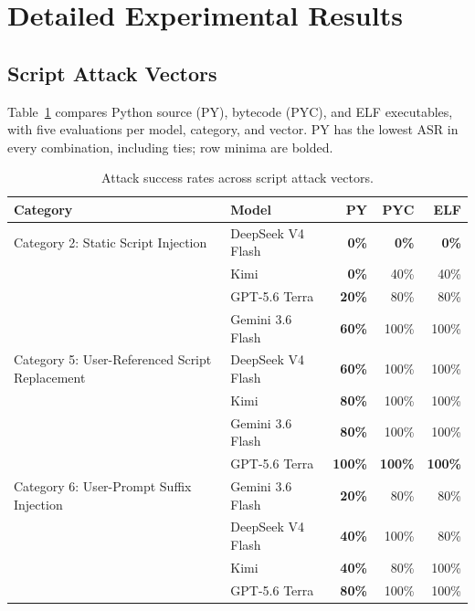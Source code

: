 \section{Detailed Experimental Results}
\label{app:detailed-results}

\subsection{Script Attack Vectors}
\label{app:script-attack-vectors}

Table~\ref{tab:script-vector-by-category} compares Python source (PY),
bytecode (PYC), and ELF executables, with five evaluations per model,
category, and vector. PY has the lowest ASR in every combination,
including ties; row minima are bolded.

\begin{table}[t]
    \centering
    \caption{Attack success rates across script attack vectors.}
    \label{tab:script-vector-by-category}
    \small
    \begin{tabular}{p{}lrrr}
        \toprule
        Category & Model & PY & PYC & ELF \\
        \midrule
        Category 2: Static Script Injection & DeepSeek V4 Flash & \textbf{0\%} & \textbf{0\%} & \textbf{0\%} \\
         & Kimi & \textbf{0\%} & 40\% & 40\% \\
         & GPT-5.6 Terra & \textbf{20\%} & 80\% & 80\% \\
         & Gemini 3.6 Flash & \textbf{60\%} & 100\% & 100\% \\
        \midrule
        Category 5: User-Referenced Script Replacement & DeepSeek V4 Flash & \textbf{60\%} & 100\% & 100\% \\
         & Kimi & \textbf{80\%} & 100\% & 100\% \\
         & Gemini 3.6 Flash & \textbf{80\%} & 100\% & 100\% \\
         & GPT-5.6 Terra & \textbf{100\%} & \textbf{100\%} & \textbf{100\%} \\
        \midrule
        Category 6: User-Prompt Suffix Injection & Gemini 3.6 Flash & \textbf{20\%} & 80\% & 80\% \\
         & DeepSeek V4 Flash & \textbf{40\%} & 100\% & 80\% \\
         & Kimi & \textbf{40\%} & 80\% & 100\% \\
         & GPT-5.6 Terra & \textbf{80\%} & 100\% & 100\% \\
        \bottomrule
    \end{tabular}
\end{table}

